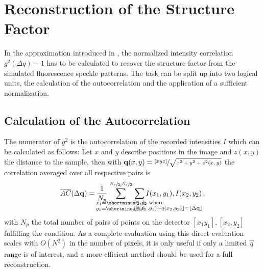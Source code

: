 \section{Reconstruction of the Structure Factor}
In the approximation introduced  in , the normalized intensity correlation $g^2(\Delta q)-1$ has to be calculated to recover the structure factor from the simulated fluorescence speckle patterns. The task can be split up into two logical units, the calculation of the autocorrelation and the application of a sufficient normalization.

\subsection{Calculation of the Autocorrelation}
The numerator of $g^2$ is the autocorrelation of the recorded intensities $I$ which can be calculated as follows:
Let $x$ and $y$ describe positions in the image and $z(x,y)$ the distance to the sample, then 
with $\mathbf{q}(x,y) = \sfrac{[x y z]}{\sqrt{x ^ 2 + y ^ 2 + z^2(x,y)}}$  the correlation averaged over all respective pairs is
\begin{equation}
	\overline{AC}(\Delta \vec{q}) = 
	\frac{1}{N_p} \quad \sum^{	\crampedclap{\sfrac{N_x}{2},\sfrac{N_y}{2}}}_{
		\crampedclap{
			\begin{subarray}{l}
				x_1=\shortminus\sfrac{N_x}{2}\\
				y_1=\shortminus\sfrac{N_y}{2}
			\end{subarray}
	}}\quad
	\sum_{\crampedclap{\qquad\qquad\qquad\qquad
			\begin{subarray}{l}
				x_2,y_2 \text{ where} \\ \lfloor q(x_1,y_1)-q(x_2,y_2)\rfloor=\lfloor\Delta\vec{q}\rfloor
	\end{subarray}}}
	I(x_1,y_1),I(x_2,y_2) \,,
	\label{eq:correlation}
\end{equation}
with $N_p$ the total number of pairs of points on the detector $[x_1 y_1],[x_2,y_2]$  fulfilling the condition. As a complete evaluation using this direct evaluation scales with $O(N^2)$ in the number of pixels, it is only useful if only a limited $\vec{q}$ range is of interest, and a more efficient method should be used for a full reconstruction.

